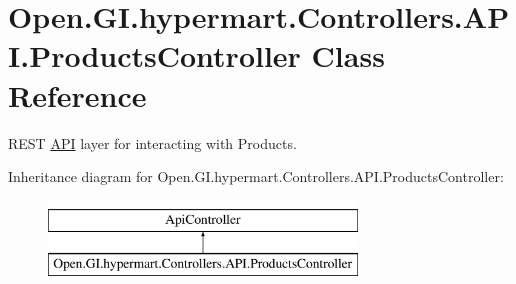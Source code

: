 \hypertarget{class_open_1_1_g_i_1_1hypermart_1_1_controllers_1_1_a_p_i_1_1_products_controller}{}\section{Open.\+G\+I.\+hypermart.\+Controllers.\+A\+P\+I.\+Products\+Controller Class Reference}
\label{class_open_1_1_g_i_1_1hypermart_1_1_controllers_1_1_a_p_i_1_1_products_controller}


R\+E\+ST \hyperlink{namespace_open_1_1_g_i_1_1hypermart_1_1_controllers_1_1_a_p_i}{A\+PI} layer for interacting with Products.  


Inheritance diagram for Open.\+G\+I.\+hypermart.\+Controllers.\+A\+P\+I.\+Products\+Controller\+:\begin{figure}[H]
\begin{center}
\leavevmode
\includegraphics[height=2.000000cm]{class_open_1_1_g_i_1_1hypermart_1_1_controllers_1_1_a_p_i_1_1_products_controller}
\end{center}
\end{figure}

